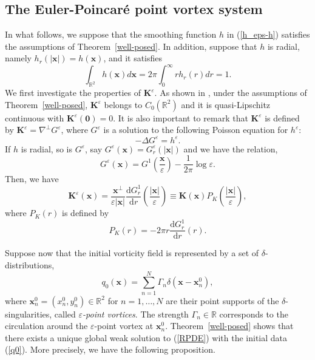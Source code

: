\documentclass{article}
\theoremstyle{definition}
\begin{document}
\subsection{The Euler-Poincar\'{e} point vortex system}
\label{EPPV}
In what follows, we suppose that the smoothing function $h$ in (\ref{h_eps-h}) satisfies the assumptions of Theorem~\ref{well-posed}. In addition, suppose that $h$ is radial, 
namely $h_r(\vert{\bm x}\vert) = h({\bm x})$, and it satisfies
\begin{equation}
\int_{\mathbb{R}^2} h({\bm x}) d{\bm x} = 2 \pi \int_0^\infty r h_r (r) dr = 1. \label{h^eps-1}
\end{equation}
We first investigate the properties of ${\bm K}^\varepsilon$. As shown in \cite{G.3}, under the assumptions of Theorem~\ref{well-posed}, ${\bm K}^\varepsilon$ belongs to
 $C_0(\mathbb{R}^2)$ and it is quasi-Lipschitz continuous with ${\bm K}^\varepsilon({\bm 0}) = 0$. It is also important to remark that ${\bm K}^\varepsilon$ is defined by
 ${\bm K}^\varepsilon = \nabla^\perp G^\varepsilon$,
 where $G^\varepsilon$ is a solution to the following Poisson equation for $h^\varepsilon$:
\begin{equation}
- \Delta G^\varepsilon = h^\varepsilon.
\label{Poisson_G}
\end{equation}
If $h$ is radial, so is $G^\varepsilon$, say $G^\varepsilon({\bm x}) = G_r^\varepsilon(\vert{\bm x}\vert)$ and we have the relation,
\begin{equation}
G^\varepsilon({\bm x}) = G^1\left( \frac{{\bm x}}{\varepsilon} \right) - \frac{1}{2 \pi}\log{\varepsilon}. 
\label{G_1}
\end{equation}
Then, we have
\begin{equation}
{\bm K}^\varepsilon({\bm x}) = \frac{{\bm x}^\perp}{\varepsilon\vert{\bm x}\vert} \frac{\mbox{d}G_r^1}{\mbox{d}r} \left( \frac{\vert{\bm x}\vert}{\varepsilon} \right) \equiv {\bm K}({\bm x}) P_K \left( \frac{\vert{\bm x}\vert}{\varepsilon} \right),  \label{K^eps-KP}
\end{equation}
where $P_K(r)$ is defined by
\begin{equation}
P_K(r) = - 2 \pi r \frac{\mbox{d}G_r^1}{\mbox{d}r} (r).
\label{P_K}
\end{equation}

Suppose now that the initial vorticity field is represented by a set of $\delta$-distributions, 
\begin{equation}
q_0({\bm x}) = \sum_{n=1}^N \Gamma_n \delta({\bm x} - {\bm x}_n^0), \label{q0}
\end{equation}
where ${\bm x}_n^0 = (x_n^0, y_n^0) \in \mathbb{R}^2$ for $n=1,\dots,N$ are their point supports of the $\delta$-singularities, called 
\textit{$\varepsilon$-point vortices}. The strength $\Gamma_n \in \mathbb{R}$ corresponds to the circulation around the $\varepsilon$-point vortex at ${\bm x}_n^0$.
Theorem~\ref{well-posed} shows that there exists a unique global weak solution to (\ref{RPDE}) with the initial data (\ref{q0}). 
More precisely, we have the following proposition.
\end{document}
